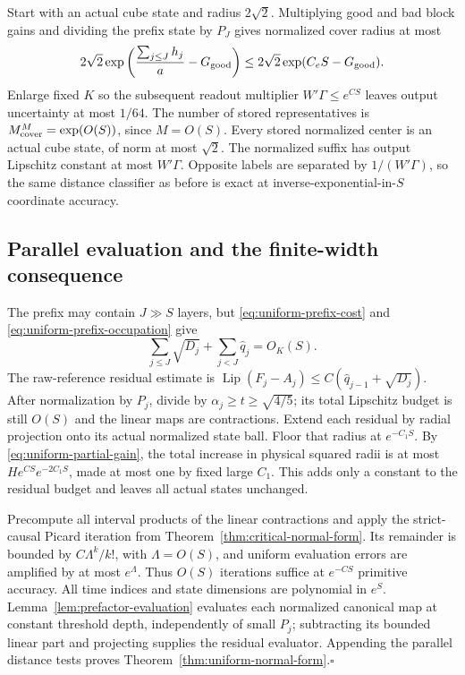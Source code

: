 \documentclass[11pt]{article}
\theoremstyle{remark}
\newcommand{\Lip}{\operatorname{Lip}}
\begin{document}
Start with an actual cube state and radius $2\sqrt2$.
Multiplying good and bad block gains and dividing the prefix
state by $P_J$ gives normalized cover radius at most
\[
 2\sqrt2\exp\left(\frac{\sum_{j\le J}h_j}{a}
                      -G_{\rm good}\right)
 \le2\sqrt2\exp(C_eS-G_{\rm good}).
\]
Enlarge fixed $K$ so the subsequent readout multiplier
$W'\Gamma\le e^{CS}$ leaves output uncertainty at most
$1/64$. The number of stored representatives is
$M_{\rm cover}^M=\exp(O(S))$, since $M=O(S)$.
Every stored normalized center is an actual cube state,
of norm at most $\sqrt2$. The normalized suffix has output
Lipschitz constant at most $W'\Gamma$. Opposite labels
are separated by $1/(W'\Gamma)$, so the same distance
classifier as before is exact at inverse-exponential-in-$S$
coordinate accuracy.

\subsection{Parallel evaluation and the finite-width consequence}

The prefix may contain $J\gg S$ layers, but
\eqref{eq:uniform-prefix-cost} and
\eqref{eq:uniform-prefix-occupation} give
\[
 \sum_{j\le J}\sqrt{D_j}+
 \sum_{j<J}\widehat q_j=O_K(S).
\]
The raw-reference residual estimate is
$\Lip(F_j-A_j)\le C(\widehat q_{j-1}+\sqrt{D_j})$.
After normalization by $P_j$, divide by
$\alpha_j\ge t\ge\sqrt{4/5}$; its total Lipschitz budget
is still $O(S)$ and the linear maps are contractions.
Extend each residual by radial projection onto its actual
normalized state ball. Floor that radius at $e^{-C_1S}$.
By \eqref{eq:uniform-partial-gain}, the total increase in
physical squared radii is at most
$H e^{CS}e^{-2C_1S}$, made at most one by fixed large $C_1$.
This adds only a constant to the residual budget and leaves
all actual states unchanged.

Precompute all interval products of the linear contractions
and apply the strict-causal Picard iteration from
Theorem~\ref{thm:critical-normal-form}. Its remainder is
bounded by $C\Lambda^k/k!$, with $\Lambda=O(S)$, and
uniform evaluation errors are amplified by at most
$e^\Lambda$. Thus $O(S)$ iterations suffice at
$e^{-CS}$ primitive accuracy.
All time indices and state dimensions are polynomial in
$e^S$. Lemma~\ref{lem:prefactor-evaluation} evaluates each
normalized canonical map at constant threshold depth,
independently of small $P_j$; subtracting its bounded linear
part and projecting supplies the residual evaluator.
Appending the parallel distance tests proves
Theorem~\ref{thm:uniform-normal-form}.\hfill$\square$
\end{document}
